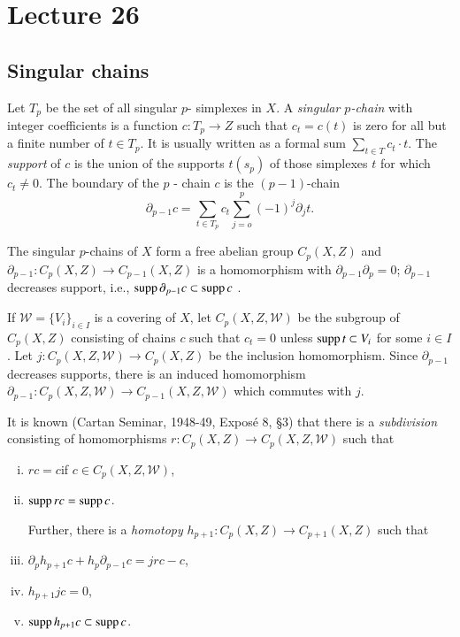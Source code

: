 \chapter{Lecture 26}%

\section*{Singular chains}\pageoriginale

\begin{defi*}%
Let $T_p$ be the set of all singular $p$- simplexes in $X$. A
{\em{singular $p$-chain}} with integer coefficients is a function $c :
T_p  \rightarrow Z$ such that $c_t = c(t)$ is zero for all but a
finite number of $t \in T_p$. It is usually written as a formal sum
$\sum\limits_{t \in T}  c_t \cdot t$. The {\em{support}} of $c$ is the
union of the supports $t(s_p)$ of those simplexes $t$ for which $c_t
\neq 0$. The boundary of the $p$ - chain $c$ is the $(p-1)$-chain 
$$
\partial_{p-1} c = \sum_{t \in T_p} c_t \sum_{j=o}^{p} (-1)^j 
\partial_j t. 
$$
\end{defi*}

The singular $p$-chains of $X$ form a free abelian group $C_p (X,Z)$
and $\partial_{p-1} : C_p(X,Z) \rightarrow C_{p-1}(X,Z)$ is a
homomorphism with $\partial_{p-1} \partial_p = 0$; $\partial_{p-1}$
decreases support, i.e., $\operatorname{supp} \partial_{p-1} c \subset \operatorname{supp} c$ . 

If $\mathscr{W} = \{V_i \}_{i \in I}$ is a covering of $X$, let $C_p
(X, Z,\mathscr{W})$ be the subgroup of $C_p(X, Z)$ consisting of
chains $c$ such that $c_t = 0$ unless $\operatorname{supp} t \subset V_i$ for some
$i \in I$. Let $j : C_p (X,Z,\mathscr{W}) \rightarrow C_p(X,Z)$ be the
inclusion homomorphism. Since $\partial_{p-1}$ decreases supports,
there is an induced homomorphism $\partial_{p-1}: C_p
(X,Z,\mathscr{W}) \rightarrow C_{p-1}(X,Z,\mathscr{W})$ which commutes
with $j$. 

It is known (Cartan Seminar, 1948-49, Expos\'e 8, \S 3) that there is
a \textit{subdivision} consisting of homomorphisms $r : C_p (X,Z)
\rightarrow C_p(X,Z,\mathscr{W})$ such that 
\begin{enumerate}[(i)]
\item $r  c = c$\pageoriginale if $c \in C_p (X,Z,\mathscr{W})$,

\item $\operatorname{supp} r  c  = \operatorname{supp} c$.

\noindent
Further, there is a \textit{homotopy} $h_{p+1} : C_p (X,Z)
\rightarrow C_{p+1}(X,Z)$ such that  

\item  $\partial_p h_{p+1} c + h_p \partial_{p-1}  c = j  r  
  c -c$, 

\item $h_{p+1} j c = 0$, 

\item $\operatorname{supp} h_{p+1} c \subset \operatorname{supp} c$.
\end{enumerate}

